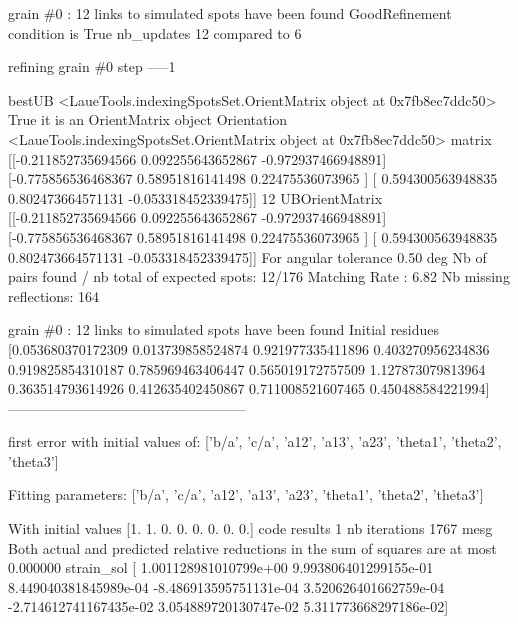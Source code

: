 \documentclass[letterpaper,10pt,english]{sphinxmanual}
\begin{document}
\begin{sphinxalltt}
grain \#0 : 12 links to simulated spots have been found
GoodRefinement condition is  True
nb\_updates 12 compared to 6


 refining grain \#0 step -----1

bestUB \textless{}LaueTools.indexingSpotsSet.OrientMatrix object at 0x7fb8ec7ddc50\textgreater{}
True it is an OrientMatrix object
Orientation \textless{}LaueTools.indexingSpotsSet.OrientMatrix object at 0x7fb8ec7ddc50\textgreater{}
matrix {[}{[}-0.211852735694566  0.092255643652867 -0.972937466948891{]}
 {[}-0.775856536468367  0.58951816141498   0.22475536073965 {]}
 {[} 0.594300563948835  0.802473664571131 -0.053318452339475{]}{]}
 12
UBOrientMatrix {[}{[}-0.211852735694566  0.092255643652867 -0.972937466948891{]}
 {[}-0.775856536468367  0.58951816141498   0.22475536073965 {]}
 {[} 0.594300563948835  0.802473664571131 -0.053318452339475{]}{]}
For angular tolerance 0.50 deg
Nb of pairs found / nb total of expected spots: 12/176
Matching Rate : 6.82
Nb missing reflections: 164

grain \#0 : 12 links to simulated spots have been found
Initial residues {[}0.053680370172309 0.013739858524874 0.921977335411896 0.403270956234836
 0.919825854310187 0.785969463406447 0.565019172757509 1.127873079813964
 0.363514793614926 0.412635402450867 0.711008521607465 0.450488584221994{]}
---------------------------------------------------



\sphinxstylestrong{***********************}
first error with initial values of: {[}'b/a', 'c/a', 'a12', 'a13', 'a23', 'theta1', 'theta2', 'theta3'{]}

\sphinxstylestrong{***********************}



\sphinxstylestrong{***********************}
Fitting parameters:   {[}'b/a', 'c/a', 'a12', 'a13', 'a23', 'theta1', 'theta2', 'theta3'{]}

\sphinxstylestrong{***********************}

With initial values {[}1. 1. 0. 0. 0. 0. 0. 0.{]}
code results 1
nb iterations 1767
mesg Both actual and predicted relative reductions in the sum of squares
  are at most 0.000000
strain\_sol {[} 1.001128981010799e+00  9.993806401299155e-01  8.449040381845989e-04
 -8.486913595751131e-04  3.520626401662759e-04 -2.714612741167435e-02
  3.054889720130747e-02  5.311773668297186e-02{]}



\end{sphinxalltt}
\end{document}
